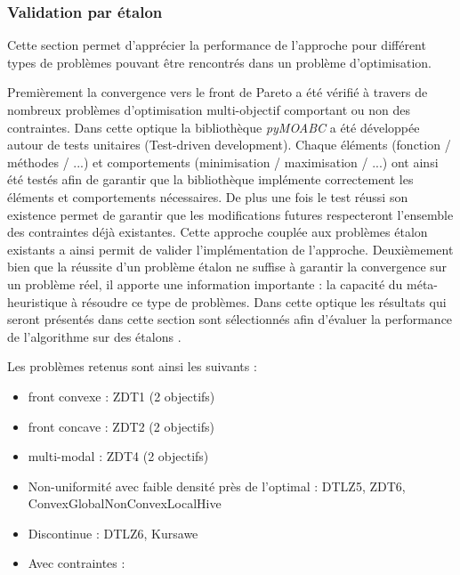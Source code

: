 \FloatBarrier


\subsubsection{Validation par étalon} %
\label{ssub:validation_par_etalon}

Cette section permet d’apprécier la performance de l’approche pour différent types
de problèmes pouvant être rencontrés dans un problème d’optimisation.

Premièrement la convergence vers le front de Pareto a été vérifié à travers de nombreux
problèmes d’optimisation multi-objectif comportant ou non des contraintes.
Dans cette optique la bibliothèque \emph{pyMOABC} a été développée autour de tests unitaires
(Test-driven development).
Chaque éléments (fonction / méthodes / ...) et comportements (minimisation / maximisation / ...)
ont ainsi été testés afin de garantir que la bibliothèque implémente correctement
les éléments et comportements nécessaires. De plus une fois le test réussi son existence
permet de garantir que les modifications futures respecteront l’ensemble des contraintes
déjà existantes.
Cette approche couplée aux problèmes étalon existants a ainsi permit de valider
l’implémentation de l’approche.
Deuxièmement bien que la réussite d’un problème étalon ne suffise à garantir la
convergence sur un problème réel, il apporte une information importante : la capacité
du méta-heuristique à résoudre ce type de problèmes. Dans cette optique les résultats
qui seront présentés dans cette section sont sélectionnés afin d’évaluer la performance
de l’algorithme sur des étalons .

Les problèmes retenus sont ainsi les suivants :
\begin{itemize}
  \item front convexe : ZDT1 (2 objectifs)
  \item front concave : ZDT2 (2 objectifs)
  \item multi-modal : ZDT4 (2 objectifs)
  \item Non-uniformité avec faible densité près de l’optimal : DTLZ5, ZDT6, ConvexGlobalNonConvexLocalHive
  \item Discontinue : DTLZ6, Kursawe
  \item Avec contraintes :
\end{itemize}


